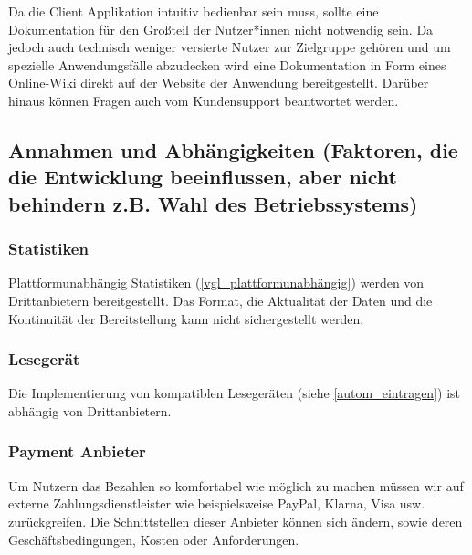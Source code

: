     Da die Client Applikation intuitiv bedienbar sein muss, sollte eine Dokumentation für den Großteil der Nutzer*innen nicht notwendig sein. Da jedoch auch technisch weniger versierte Nutzer zur Zielgruppe gehören und um spezielle Anwendungsfälle abzudecken wird eine Dokumentation in Form eines Online-Wiki direkt auf der Website der Anwendung bereitgestellt. Darüber hinaus können Fragen auch vom Kundensupport beantwortet werden. 

\subsection{Annahmen und Abhängigkeiten (Faktoren, die die Entwicklung beeinflussen, aber nicht behindern z.B. Wahl des Betriebssystems)}


\subsubsection{Statistiken}
    Plattformunabhängig Statistiken (\ref{vgl_plattformunabhängig}) werden von Drittanbietern bereitgestellt. Das Format, die Aktualität der Daten und die Kontinuität der Bereitstellung kann nicht sichergestellt werden. 


\subsubsection{Lesegerät}
    Die Implementierung von kompatiblen Lesegeräten (siehe \ref{autom_eintragen}) ist abhängig von Drittanbietern.
\subsubsection{Payment Anbieter}

    Um Nutzern das Bezahlen so komfortabel wie möglich zu machen müssen wir auf externe Zahlungsdienstleister wie beispielsweise PayPal, Klarna, Visa usw. zurückgreifen. Die Schnittstellen dieser Anbieter können sich ändern, sowie deren Geschäftsbedingungen, Kosten oder Anforderungen. 
    